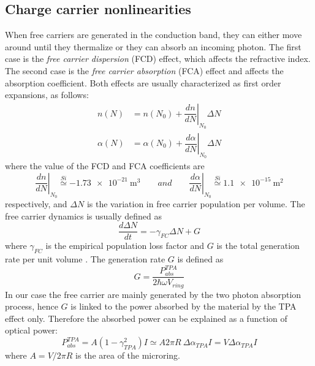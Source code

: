 \subsection{Charge carrier nonlinearities}
\label{ssec:Charge_carrier_nonlinearities}
When free carriers are generated in the conduction band, they can either move around until they thermalize or they can absorb an incoming photon.
The first case is the \textit{free carrier dispersion} (FCD) effect, which affects the refractive index.
The second case is the \textit{free carrier absorption} (FCA) effect and affects the absorption coefficient.
Both effects are usually characterized as first order expansions, as follows:
\begin{align}
	n			\left(N	\right) &= n				\left(N_0\right) + \left.\dfrac{dn}{dN}\right|_{N_0} \Delta N \\
	\alpha	\left(N	\right) &= \alpha	\left(N_0\right) + \left.\dfrac{d\alpha}{dN}\right|_{N_0} \Delta N
\end{align}
where the value of the FCD and FCA coefficients are \cite{Reed2008,moss2013semiconductor}
\begin{equation}
	\left.\dfrac{dn}{dN}\right|_{N_0} \overset{Si}{\simeq} \SI{-1.73e-21}{\cubic\m}
	\qquad and \qquad
	\left.\dfrac{d\alpha}{dN}\right|_{N_0} \overset{Si}{\simeq} \SI{1.1e-15}{\square\m}
\end{equation}
respectively, and $\Delta N$ is the variation in free carrier population per volume.
The free carrier dynamics is usually defined as
\begin{equation}
	\frac{d\Delta N}{dt} = -\gamma_{FC} \Delta N + G
\end{equation}
where $\gamma_{FC}$ is the empirical population loss factor and $G$ is the total generation rate per unit volume \cite{mancinelli2013linear}.
The generation rate $G$ is defined as
\begin{equation}
G = \frac{P_{abs}^{TPA}}{2\hbar\omega V_{ring}}
\end{equation}
In our case the free carrier are mainly generated by the two photon absorption process, hence $G$ is linked to the power absorbed by the material by the TPA effect only.
Therefore the absorbed power can be explained as a function of optical power:
\begin{equation}
	P_{abs}^{TPA} = A \left(1-\gamma_{TPA}^2\right) I
	\simeq A2\pi R~\Delta\alpha_{TPA} I
	= V\Delta\alpha_{TPA}I
\end{equation}
where $A=V/2\pi R$ is the area of the microring.

